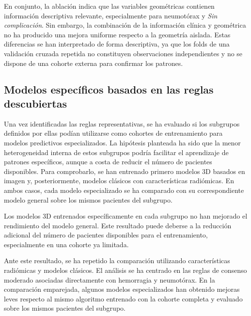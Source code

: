 En conjunto, la ablación indica que las variables geométricas contienen información descriptiva relevante, especialmente para neumotórax y \textit{Sin complicación}. Sin embargo, la combinación de la información clínica y geométrica no ha producido una mejora uniforme respecto a la geometría aislada. Estas diferencias se han interpretado de forma descriptiva, ya que los folds de una validación cruzada repetida no constituyen observaciones independientes y no se dispone de una cohorte externa para confirmar los patrones.

\subsection{Modelos específicos basados en las reglas descubiertas}
Una vez identificadas las reglas representativas, se ha evaluado si los subgrupos definidos por ellas podían utilizarse como cohortes de entrenamiento para modelos predictivos especializados. La hipótesis planteada ha sido que la menor heterogeneidad interna de estos subgrupos podría facilitar el aprendizaje de patrones específicos, aunque a costa de reducir el número de pacientes disponibles. Para comprobarlo, se han entrenado primero modelos 3D basados en imagen y, posteriormente, modelos clásicos con características radiómicas. En ambos casos, cada modelo especializado se ha comparado con su correspondiente modelo general sobre los mismos pacientes del subgrupo.

Los modelos 3D entrenados específicamente en cada subgrupo no han mejorado el rendimiento del modelo general. Este resultado puede deberse a la reducción adicional del número de pacientes disponibles para el entrenamiento, especialmente en una cohorte ya limitada.

Ante este resultado, se ha repetido la comparación utilizando características radiómicas y modelos clásicos. El análisis se ha centrado en las reglas de consenso moderado asociadas directamente con hemorragia y neumotórax. En la comparación emparejada, algunos modelos especializados han obtenido mejoras leves respecto al mismo algoritmo entrenado con la cohorte completa y evaluado sobre los mismos pacientes del subgrupo.

